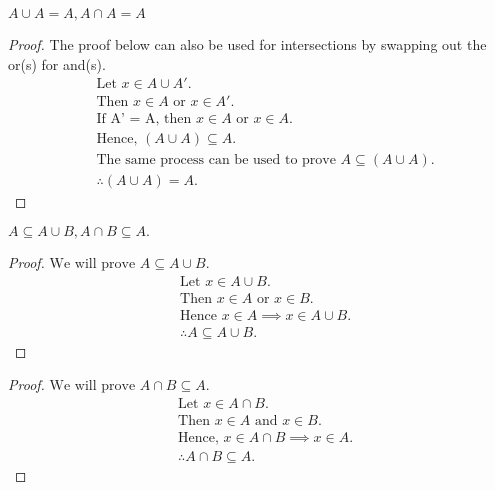 \begin{question}
  $A \cup A = A, A \cap A = A$
\end{question}
\begin{proof}
  The proof below can also be used for intersections by swapping out the or(s) for and(s).
  \begin{align*}
    & \text{Let } x \in A \cup A'. \\
    & \text{Then } x \in A \text{ or } x \in A'. \\
    & \text{If A' = A, then } x \in A \text{ or } x \in A. \\
    & \text{Hence, } (A \cup A) \subseteq A. \\
    & \text{The same process can be used to prove } A \subseteq (A \cup A). \\
    & \therefore (A \cup A) = A.
  \end{align*}
\end{proof}

\begin{question}
  $ A \subseteq A \cup B, A \cap B \subseteq A. $
\end{question}
\begin{proof}
  $\text{We will prove } A \subseteq A \cup B.$
  \begin{align*}
    & \text{Let } x \in A \cup B. \\
    & \text{Then } x \in A \text{ or } x \in B. \\
    & \text{Hence } x \in A \implies x \in A \cup B. \\
    & \therefore A \subseteq A \cup B.
  \end{align*}
\end{proof}
\begin{proof}
  $\text{We will prove } A \cap B \subseteq A.$
  \begin{align*}
    & \text{Let } x \in A \cap B. \\
    & \text{Then } x \in A \text{ and } x \in B. \\
    & \text{Hence, } x \in  A \cap B \implies x \in A. \\
    & \therefore A \cap B \subseteq A.
  \end{align*}
\end{proof}

